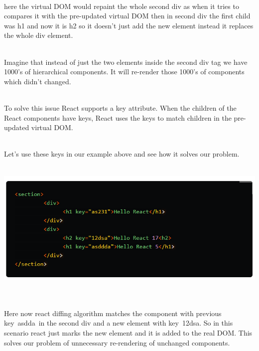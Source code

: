 \documentclass{article}
\begin{document}
\noindent 
{\bf }

\noindent 
{\bf }

\noindent 
{\bf }

\noindent 
\\
here the virtual DOM would repaint the whole second div as when it tries to compares it with the pre-updated virtual DOM then in second div the first child was h1 and now it is h2 so it doesn't just add the new element instead it replaces the whole div element.

\noindent 
\\
Imagine that instead of just the two elements inside the second div tag we have 1000's of hierarchical components. It will re-render those 1000's of components which didn't changed.

\noindent 
\\
To solve this issue React supports a key attribute. When the children of the React components have keys, React uses the keys to match children in the pre-updated virtual DOM.

\noindent 
\\

Let's use these keys in our example above and see how it solves our problem.

\noindent 
{\bf \includegraphics*[width=6.26in, height=2.58in]{IMG-06-04}}

\noindent 
{\bf }

\noindent 
{\bf }

\noindent 
\\
Here now react diffing algorithm matches the component with previous key~asdda~in the second div and a new element with key~12dsa. So in this scenario react just marks the new element and it is added to the real DOM. This solves our problem of unnecessary re-rendering of unchanged components.

\noindent 
{\bf }
\\
\end{document}
